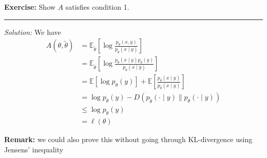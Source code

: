 \documentclass[12pt]{report}
\newcommand{\E}{\mathbb{E}}
\renewcommand{\div}{\vspace*{10pt}\hrule\vspace*{10pt}}
\newcommand*{\tbf}[1]{\ifmmode\mathbf{#1}\else\textbf{#1}\fi}
\newenvironment*{exercise}[1][red]{
    \begin{tcolorbox}[
        parbox=false,
        colback=#1!5!white,
        colframe=#1!75!black,
        breakable
    ]}
    {\end{tcolorbox}}
\begin{document}
\begin{exercise}
	\textbf{Exercise:} Show $A$ satisfies condition 1.

	\div

	\emph{Solution:} We have
	\begin{align*}
		A(\theta, \tilde \theta) & = \E_{\tilde \theta} \left[\log \frac{p_{\theta}(x, y)}{p_{\tilde \theta}(x \; | \; y)}\right]                     \\
		                         & = \E_{\tilde \theta} \left[\log \frac{p_{\theta}(x \; | \;y) p_{\theta}(y)}{p_{\tilde \theta}(x \; | \; y)}\right] \\
		                         & = \E[\log p_{\theta}(y)] + \E\left[\frac{p_{\theta}(x \; | \; y)}{p_{\tilde \theta}(x \; | \; y)}\right]           \\
		                         & = \log p_{\theta}(y) - D(p_{\tilde \theta}(\cdot \; | \; y) \parallel p_{\theta}(\cdot \; | \; y))                 \\
		                         & \leq \log p_{\theta}(y)                                                                                            \\
		                         & = \ell(\theta)
	\end{align*}

	\tbf{Remark:} we could also prove this without going through KL-divergence using Jensens' inequality

\end{exercise}
\end{document}
